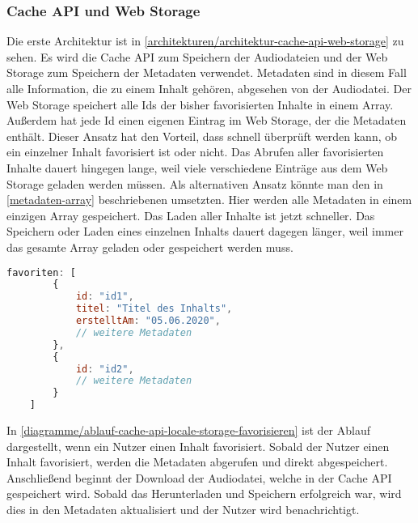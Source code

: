 \subsubsection{Cache API und Web Storage}
Die erste Architektur ist in \autoref{architekturen/architektur-cache-api-web-storage} zu sehen. Es wird die Cache \ac{API} zum Speichern der Audiodateien und der Web Storage zum Speichern der Metadaten verwendet. Metadaten sind in diesem Fall alle Information, die zu einem Inhalt gehören, abgesehen von der Audiodatei. Der Web Storage speichert alle Ids der bisher favorisierten Inhalte in einem Array. Außerdem hat jede Id einen eigenen Eintrag im Web Storage, der die Metadaten enthält. Dieser Ansatz hat den Vorteil, dass schnell überprüft werden kann, ob ein einzelner Inhalt favorisiert ist oder nicht. Das Abrufen aller favorisierten Inhalte dauert hingegen lange, weil viele verschiedene Einträge aus dem Web Storage geladen werden müssen. Als alternativen Ansatz könnte man den in \autoref{metadaten-array} beschriebenen umsetzten. Hier werden alle Metadaten in einem einzigen Array gespeichert. Das Laden aller Inhalte ist jetzt schneller. Das Speichern oder Laden eines einzelnen Inhalts dauert dagegen länger, weil immer das gesamte Array geladen oder gespeichert werden muss.


\begin{lstlisting}[language=JavaScript,caption={Speichern der Metadaten in einem Array},label={metadaten-array}]
    favoriten: [
    	{
    		id: "id1",
    		titel: "Titel des Inhalts",
    		erstelltAm: "05.06.2020",
    		// weitere Metadaten
    	},
    	{
    		id: "id2",
    		// weitere Metadaten
    	}
    ]
\end{lstlisting}

In \autoref{diagramme/ablauf-cache-api-locale-storage-favorisieren} ist der Ablauf dargestellt, wenn ein Nutzer einen Inhalt favorisiert. Sobald der Nutzer einen Inhalt favorisiert, werden die Metadaten abgerufen und direkt abgespeichert. Anschließend beginnt der Download der Audiodatei, welche in der Cache \ac{API} gespeichert wird. Sobald das Herunterladen und Speichern erfolgreich war, wird dies in den Metadaten aktualisiert und der Nutzer wird benachrichtigt.


